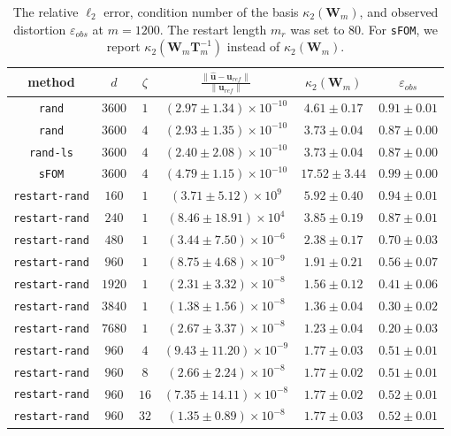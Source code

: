 \documentclass[smallextended]{svjour3}
\renewcommand{\vec}[1]{\mathbf{#1}}
\newcommand{\mat}[1]{\mathbf{#1}}
\newcommand{\norm}[1]{\| #1 \|}
\begin{document}
\begin{table}[t]
\centering
\caption{The relative $\ell_2$ error, condition number of the basis $\kappa_2(\mat{W}_m)$, and observed distortion $\varepsilon_{obs}$ at $m = 1200$. The restart length $m_r$ was set to $80$. For \texttt{sFOM}, we report $\kappa_2(\mat{W}_m \mat{T}_m^{-1})$ instead of $\kappa_2(\mat{W}_m)$.}
\label{tab:drum-sketching}
\begin{tabular}{cccccc}
\hline
method & $d$ & $\zeta$ & $\frac{\norm{\hat{\vec{u}} - \vec{u}_{ref}}}{\norm{\vec{u}_{ref}}}$ & $\kappa_2(\mat{W}_m)$ & $\varepsilon_{obs}$ \\
\hline
\texttt{rand} & $3600$ & $1$ & $(2.97 \pm 1.34) \times 10^{-10}$ & $4.61 \pm 0.17$ & $0.91 \pm 0.01$ \\
\texttt{rand} & $3600$ & $4$ & $(2.93 \pm 1.35) \times 10^{-10}$ & $3.73 \pm 0.04$ & $0.87 \pm 0.00$ \\
\texttt{rand-ls} & $3600$ & $4$ & $(2.40 \pm 2.08) \times 10^{-10}$ & $3.73 \pm 0.04$ & $0.87 \pm 0.00$ \\
\texttt{sFOM} & $3600$ & $4$ & $(4.79 \pm 1.15) \times 10^{-10}$ & $17.52 \pm 3.44$ & $0.99 \pm 0.00$ \\
\hline
\texttt{restart-rand} & $160$ & $1$ & $(3.71 \pm 5.12) \times 10^{9}$ & $5.92 \pm 0.40$ & $0.94 \pm 0.01$ \\
\texttt{restart-rand} & $240$ & $1$ & $(8.46 \pm 18.91) \times 10^{4}$ & $3.85 \pm 0.19$ & $0.87 \pm 0.01$ \\
\texttt{restart-rand} & $480$ & $1$ & $(3.44 \pm 7.50) \times 10^{-6}$ & $2.38 \pm 0.17$ & $0.70 \pm 0.03$ \\
\texttt{restart-rand} & $960$ & $1$ & $(8.75 \pm 4.68) \times 10^{-9}$ & $1.91 \pm 0.21$ & $0.56 \pm 0.07$ \\
\texttt{restart-rand} & $1920$ & $1$ & $(2.31 \pm 3.32) \times 10^{-8}$ & $1.56 \pm 0.12$ & $0.41 \pm 0.06$ \\
\texttt{restart-rand} & $3840$ & $1$ & $(1.38 \pm 1.56) \times 10^{-8}$ & $1.36 \pm 0.04$ & $0.30 \pm 0.02$ \\
\texttt{restart-rand} & $7680$ & $1$ & $(2.67 \pm 3.37) \times 10^{-8}$ & $1.23 \pm 0.04$ & $0.20 \pm 0.03$ \\
\hline
\texttt{restart-rand} & $960$ & $4$ & $(9.43 \pm 11.20) \times 10^{-9}$ & $1.77 \pm 0.03$ & $0.51 \pm 0.01$ \\
\texttt{restart-rand} & $960$ & $8$ & $(2.66 \pm 2.24) \times 10^{-8}$ & $1.77 \pm 0.02$ & $0.51 \pm 0.01$ \\
\texttt{restart-rand} & $960$ & $16$ & $(7.35 \pm 14.11) \times 10^{-8}$ & $1.77 \pm 0.02$ & $0.52 \pm 0.01$ \\
\texttt{restart-rand} & $960$ & $32$ & $(1.35 \pm 0.89) \times 10^{-8}$ & $1.77 \pm 0.03$ & $0.52 \pm 0.01$ \\
\hline
\end{tabular}
\end{table}
\end{document}
